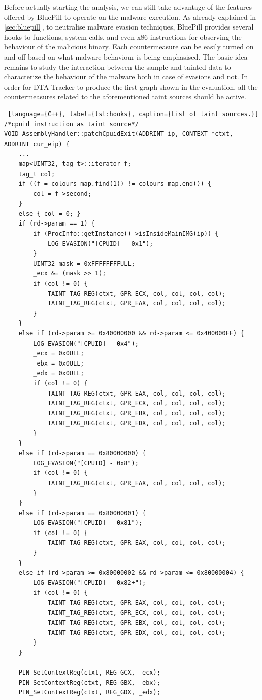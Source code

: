 \documentclass[LaM,binding=0.6cm]{sapthesis}
\begin{document}
\noindent
Before actually starting the analysis, we can still take advantage of the features offered by BluePill to operate on the malware execution. As already explained in \autoref{sec:bluepill}, to neutralise malware evasion techniques, BluePill provides several hooks to functions, system calls, and even x$86$ instructions for observing the behaviour of the malicious binary. Each countermeasure can be easily turned on and off based on what malware behaviour is being emphasised. The basic idea remains to study the interaction between the sample and tainted data to characterize the behaviour of the malware both in case of evasions and not. In order for {\sf DTA-Tracker} to produce the first graph shown in the evaluation, all the countermeasures related to the aforementioned taint sources should be active.
\begin{lstlisting} [language={C++}, label={lst:hooks}, caption={List of taint sources.}]
/*cpuid instruction as taint source*/
VOID AssemblyHandler::patchCpuidExit(ADDRINT ip, CONTEXT *ctxt, ADDRINT cur_eip) {
	...
	map<UINT32, tag_t>::iterator f;
	tag_t col;
	if ((f = colours_map.find(1)) != colours_map.end()) {
		col = f->second;
	}
	else { col = 0; }
	if (rd->param == 1) {
		if (ProcInfo::getInstance()->isInsideMainIMG(ip)) {
			LOG_EVASION("[CPUID] - 0x1");
		}
		UINT32 mask = 0xFFFFFFFFULL;
		_ecx &= (mask >> 1);
		if (col != 0) {
			TAINT_TAG_REG(ctxt, GPR_ECX, col, col, col, col);
			TAINT_TAG_REG(ctxt, GPR_EAX, col, col, col, col);
		}
	}
	else if (rd->param >= 0x40000000 && rd->param <= 0x400000FF) {
		LOG_EVASION("[CPUID] - 0x4");
		_ecx = 0x0ULL;
		_ebx = 0x0ULL;
		_edx = 0x0ULL;
		if (col != 0) {
			TAINT_TAG_REG(ctxt, GPR_EAX, col, col, col, col);
			TAINT_TAG_REG(ctxt, GPR_ECX, col, col, col, col);
			TAINT_TAG_REG(ctxt, GPR_EBX, col, col, col, col);
			TAINT_TAG_REG(ctxt, GPR_EDX, col, col, col, col);
		}
	}
	else if (rd->param == 0x80000000) {
		LOG_EVASION("[CPUID] - 0x8");
		if (col != 0) {
			TAINT_TAG_REG(ctxt, GPR_EAX, col, col, col, col);
		}
	}
	else if (rd->param == 0x80000001) {
		LOG_EVASION("[CPUID] - 0x81");
		if (col != 0) {
			TAINT_TAG_REG(ctxt, GPR_EAX, col, col, col, col);
		}
	}
	else if (rd->param >= 0x80000002 && rd->param <= 0x80000004) {
		LOG_EVASION("[CPUID] - 0x82+");
		if (col != 0) {
			TAINT_TAG_REG(ctxt, GPR_EAX, col, col, col, col);
			TAINT_TAG_REG(ctxt, GPR_ECX, col, col, col, col);
			TAINT_TAG_REG(ctxt, GPR_EBX, col, col, col, col);
			TAINT_TAG_REG(ctxt, GPR_EDX, col, col, col, col);
		}
	}

	PIN_SetContextReg(ctxt, REG_GCX, _ecx);
	PIN_SetContextReg(ctxt, REG_GBX, _ebx);
	PIN_SetContextReg(ctxt, REG_GDX, _edx);


\end{lstlisting}
\end{document}
